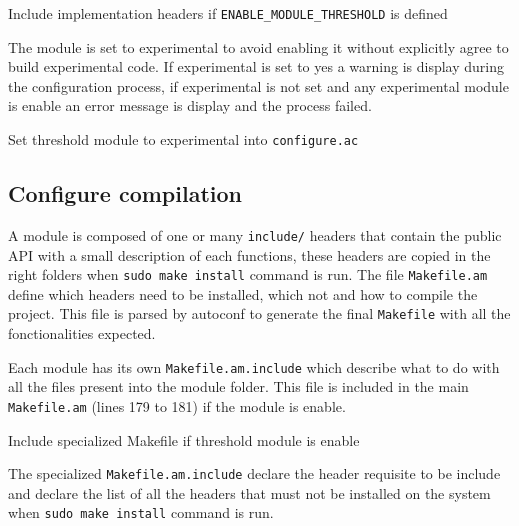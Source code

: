 \begin{listing}
	\caption{Include implementation headers if \texttt{ENABLE\_MODULE\_THRESHOLD} is
  defined}
	\label{lst:includeThresholdImplementationHeaders}
\end{listing}

The module is set to experimental to avoid enabling it without explicitly agree
to build experimental code. If experimental is set to yes a warning is display
during the configuration process, if experimental is not set and any experimental
module is enable an error message is display and the process failed.

\begin{listing}
	\caption{Set threshold module to experimental into \texttt{configure.ac}}
	\label{lst:setModuleExperimental}
\end{listing}

\subsection{Configure compilation}

A module is composed of one or many \texttt{include/} headers that
contain the public API with a small description of each functions, these headers
are copied in the right folders when \texttt{sudo make install} command is run.
The file \texttt{Makefile.am} define which headers need to be installed, which
not and how to compile the project. This file is parsed by autoconf to generate
the final \texttt{Makefile} with all the fonctionalities expected.

Each module has its own \texttt{Makefile.am.include} which describe what to do
with all the files present into the module folder. This file is included in the
main \texttt{Makefile.am} (lines 179 to 181) if the module is enable.

\begin{listing}
	\caption{Include specialized Makefile if threshold module is enable}
	\label{lst:includeSpecializedMakefile}
\end{listing}

The specialized \texttt{Makefile.am.include} declare the header requisite to be
include and declare the list of all the headers that must not be installed on
the system when \texttt{sudo make install} command is run.

